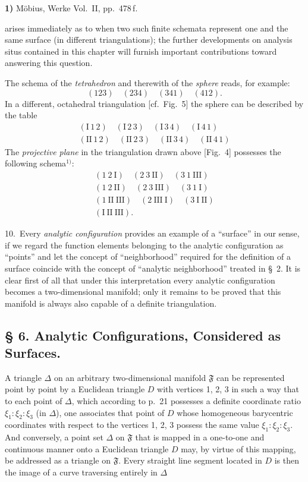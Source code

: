 \documentclass{article}
\begin{document}
\textbf{1)} Möbius, Werke Vol.~II, pp.~478\,f.

arises immediately as to when two such finite schemata represent one and the same surface (in different triangulations); the further developments on analysis situs contained in this chapter will furnish important contributions toward answering this question.

The schema of the \emph{tetrahedron} and therewith of the \emph{sphere} reads, for example:
\[
(123) \quad (234) \quad (341) \quad (412).
\]
In a different, octahedral triangulation [cf.\ Fig.~5] the sphere can be described by the table
\[
\begin{gathered}
( \text{I}\,1\,2 ) \quad ( \text{I}\,2\,3 ) \quad ( \text{I}\,3\,4 ) \quad ( \text{I}\,4\,1 ) \\
( \text{II}\,1\,2 ) \quad ( \text{II}\,2\,3 ) \quad ( \text{II}\,3\,4 ) \quad ( \text{II}\,4\,1 )
\end{gathered}
\]
The \emph{projective plane} in the triangulation drawn above [Fig.~4] possesses the following schema${}^{1)}$:
\[
\begin{gathered}
( 1\ 2\ \text{I} ) \quad ( 2\ 3\ \text{II} ) \quad ( 3\ 1\ \text{III} ) \\
( 1\ 2\ \text{II} ) \quad ( 2\ 3\ \text{III} ) \quad ( 3\ 1\ \text{I} ) \\
( 1\ \text{II}\ \text{III} ) \quad ( 2\ \text{III}\ \text{I} ) \quad ( 3\ \text{I}\ \text{II} ) \\
( \text{I}\ \text{II}\ \text{III} ).
\end{gathered}
\]

10.\ Every \emph{analytic configuration} provides an example of a ``surface'' in our sense, if we regard the function elements belonging to the analytic configuration as ``points'' and let the concept of ``neighborhood'' required for the definition of a surface coincide with the concept of ``analytic neighborhood'' treated in §~2. It is clear first of all that under this interpretation every analytic configuration becomes a two-dimensional manifold; only it remains to be proved that this manifold is always also capable of a definite triangulation.

\subsection*{§ 6. Analytic Configurations, Considered as Surfaces.}

A triangle $\Delta$ on an arbitrary two-dimensional manifold $\mathfrak{F}$ can be represented point by point by a Euclidean triangle $D$ with vertices 1, 2, 3 in such a way that to each point of $\Delta$, which according to p.\ 21 possesses a definite coordinate ratio $\xi_1 : \xi_2 : \xi_3$ (in $\Delta$), one associates that point of $D$ whose homogeneous barycentric coordinates with respect to the vertices 1, 2, 3 possess the same value $\xi_1 : \xi_2 : \xi_3$. And conversely, a point set $\Delta$ on $\mathfrak{F}$ that is mapped in a one-to-one and continuous manner onto a Euclidean triangle $D$ may, by virtue of this mapping, be addressed as a triangle on $\mathfrak{F}$. Every straight line segment located in $D$ is then the image of a curve traversing entirely in $\Delta$
\end{document}
